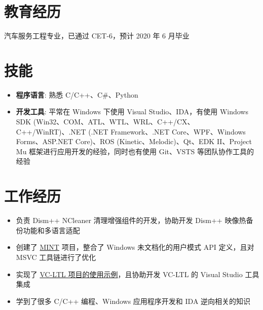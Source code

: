\documentclass{resume}
\begin{document}
\renewcommand\headrulewidth{0pt}



\section{教育经历}

  汽车服务工程专业，已通过 CET-6，预计 2020 年 6 月毕业

\section{技能}
\begin{itemize}
  
  \item \textbf{程序语言}:
    熟悉 C/C++、C\#、Python
  
  \item \textbf{开发工具}:
    平常在 Windows 下使用 Visual Studio、IDA，有使用 Windows SDK (Win32、COM、ATL、WTL、WRL、C++/CX、C++/WinRT)、.NET (.NET Framework、.NET Core、WPF、Windows Forms、ASP.NET Core)、ROS (Kinetic、Melodic)、Qt、EDK II、Project Mu 框架进行应用开发的经验，同时也有使用 Git、VSTS 等团队协作工具的经验

\end{itemize}

\section{工作经历}

\begin{itemize}
  \item 负责 Dism++ NCleaner 清理增强组件的开发，协助开发 Dism++ 映像热备份功能和多语言适配
  \item 创建了 \href{https://github.com/Chuyu-Team/MINT}{MINT} 项目，整合了 Windows 未文档化的用户模式 API 定义，且对 MSVC 工具链进行了优化
  \item 实现了 \href{https://github.com/Chuyu-Team/vc-ltl-samples}{VC-LTL 项目的使用示例}，且协助开发 VC-LTL 的 Visual Studio 工具集成
  \item 学到了很多 C/C++ 编程、Windows 应用程序开发和 IDA 逆向相关的知识
\end{itemize}
\end{document}

